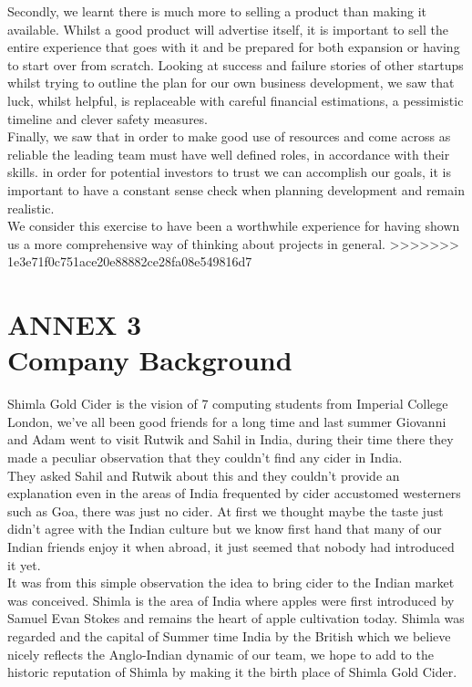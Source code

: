 \documentclass[11pt]{article}
\begin{document}
\noindent Secondly, we learnt there is much more to selling a product than making it available. Whilst a good product will advertise itself, it is important to sell the entire experience that goes with it and be prepared for both expansion or having to start over from scratch. Looking at success and failure stories of other startups whilst trying to outline the plan for our own business development, we saw that luck, whilst helpful, is replaceable with careful financial estimations, a pessimistic timeline and clever safety measures. \\

\noindent Finally, we saw that in order to make good use of resources and come across as reliable the leading team must have well defined roles, in accordance with their skills. in order for potential investors to trust we can accomplish our goals, it is important to have a constant sense check when planning development and remain realistic.\\

\noindent We consider this exercise to have been a worthwhile experience for having shown us a more comprehensive way of thinking about projects in general.
>>>>>>> 1e3e71f0c751ace20e88882ce28fa08e549816d7

\newpage

\section{ANNEX 3 \\ Company Background}
Shimla Gold Cider is the vision of 7 computing students from Imperial College London, we've all been good friends for a long time and last summer Giovanni and Adam went to visit Rutwik and Sahil in India, during their time there they made a peculiar observation that they couldn't find any cider in India. \\
They asked Sahil and Rutwik about this and they couldn't provide an explanation even in the areas of India frequented by cider accustomed westerners such as Goa, there was just no cider. At first we thought maybe the taste just didn't agree with the Indian culture but we know first hand that many of our Indian friends enjoy it when abroad, it just seemed that nobody had introduced it yet. \\
It was from this simple observation the idea to bring cider to the Indian market was conceived. Shimla is the area of India where apples were first introduced by Samuel Evan Stokes and remains the heart of apple cultivation today. Shimla was regarded and the capital of Summer time India by the British which we believe nicely reflects the Anglo-Indian dynamic of our team, we hope to add to the historic reputation of Shimla by making it the birth place of Shimla Gold Cider.
\end{document}
